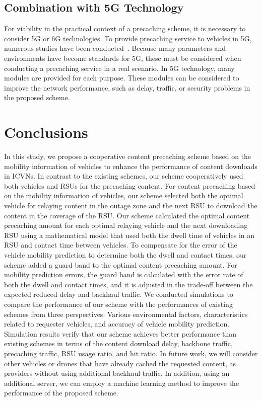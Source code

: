 \documentclass[electronics,aricle,accept,pdftex,moreauthors]{Definitions/mdpi}
\begin{document}
\subsection{Combination with 5G Technology}
For viability in the practical context of a precaching scheme, it is necessary to consider 5G or 6G technologies. To provide precaching service to vehicles in 5G, numerous studies have been conducted~\cite{Mehteroglu2017Sema, Liang2018Enab}. Because many parameters and environments have become standards for 5G, these must be considered when conducting a precaching service in a real scenario. In 5G technology, many modules are provided for each purpose. These modules can be considered to improve the network performance, such as delay, traffic, or security problems in the proposed scheme.

\section{Conclusions} \label{sec6}
In this study, we propose a cooperative content precaching scheme based on the mobility information of vehicles to enhance the performance of content downloads in ICVNs. In contrast to the existing schemes, our scheme cooperatively used both vehicles and RSUs for the precaching content. For content precaching based on the mobility information of vehicles, our scheme selected both the optimal vehicle for relaying content in the outage zone and the next RSU to download the content in the coverage of the RSU. Our scheme calculated the optimal content precaching amount for each optimal relaying vehicle and the next downloading RSU using a mathematical model that used both the dwell time of vehicles in an RSU and contact time between vehicles. To compensate for the error of the vehicle mobility prediction to determine both the dwell and contact times, our scheme added a guard band to the optimal content precaching amount. For mobility prediction errors, the guard band is calculated with the error rate of both the dwell and contact times, and it is adjusted in the trade-off between the expected reduced delay and backhaul traffic. We conducted simulations to compare the performance of our scheme with the performances of existing schemes from three perspectives: Various environmental factors, characteristics related to requester vehicles, and accuracy of vehicle mobility prediction. Simulation results verify that our scheme achieves better performance than existing schemes in terms of the content download delay, backbone traffic, precaching traffic, RSU usage ratio, and hit ratio. In future work, we will consider other vehicles or drones that have already cached the requested content, as providers without using additional backhaul traffic. In addition, using an additional server, we can employ a machine learning method to improve the performance of the proposed scheme.
\end{document}
